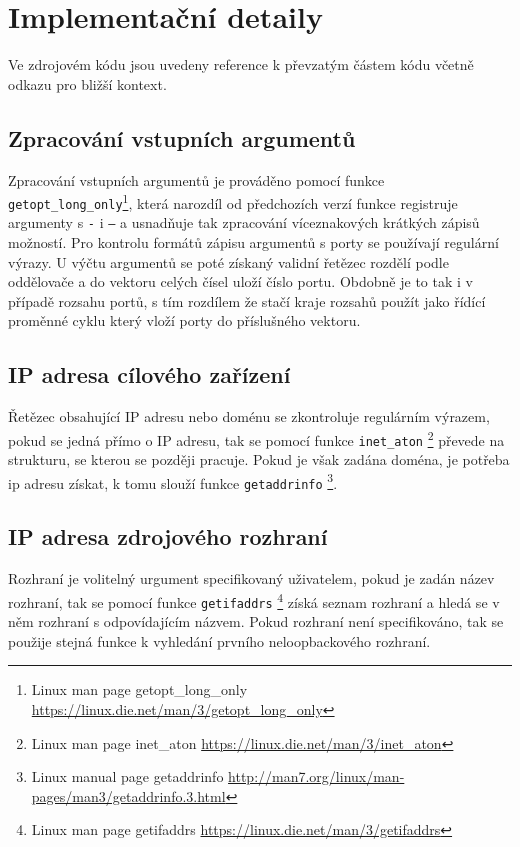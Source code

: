 \documentclass[a4paper, 11pt]{article}
\begin{document}
\section{Implementační detaily}
Ve zdrojovém kódu jsou uvedeny reference k převzatým částem kódu včetně odkazu pro bližší kontext.
\subsection{Zpracování vstupních argumentů}
Zpracování vstupních argumentů je prováděno pomocí funkce \texttt{getopt\_long\_only}\footnote{Linux man page getopt\_long\_only \url{https://linux.die.net/man/3/getopt_long_only}}, která narozdíl od předchozích verzí funkce registruje argumenty s \texttt{-} i \texttt{--} a usnadňuje tak zpracování víceznakových krátkých zápisů možností. Pro kontrolu formátů zápisu argumentů s porty se používají regulární výrazy. U výčtu argumentů se poté získaný validní řetězec rozdělí podle oddělovače a do vektoru celých čísel uloží číslo portu. Obdobně je to tak i v případě rozsahu portů, s tím rozdílem že stačí kraje rozsahů použít jako řídící proměnné cyklu který vloží porty do příslušného vektoru.

\subsection{IP adresa cílového zařízení}
Řetězec obsahující IP adresu nebo doménu se zkontroluje regulárním výrazem, pokud se jedná přímo o IP adresu, tak se pomocí funkce \texttt{inet\_aton} \footnote{Linux man page inet\_aton \url{https://linux.die.net/man/3/inet_aton}} převede na strukturu, se kterou se později pracuje. Pokud je však zadána doména, je potřeba ip adresu získat, k tomu slouží funkce \texttt{getaddrinfo} \footnote{Linux manual page getaddrinfo \url{http://man7.org/linux/man-pages/man3/getaddrinfo.3.html}}.

\subsection{IP adresa zdrojového rozhraní}
Rozhraní je volitelný urgument specifikovaný uživatelem, pokud je zadán název rozhraní, tak se pomocí funkce \texttt{getifaddrs} \footnote{Linux man page getifaddrs \url{https://linux.die.net/man/3/getifaddrs}} získá seznam rozhraní a hledá se v něm rozhraní s odpovídajícím názvem. Pokud rozhraní není specifikováno, tak se použije stejná funkce k vyhledání prvního neloopbackového rozhraní.
\end{document}

